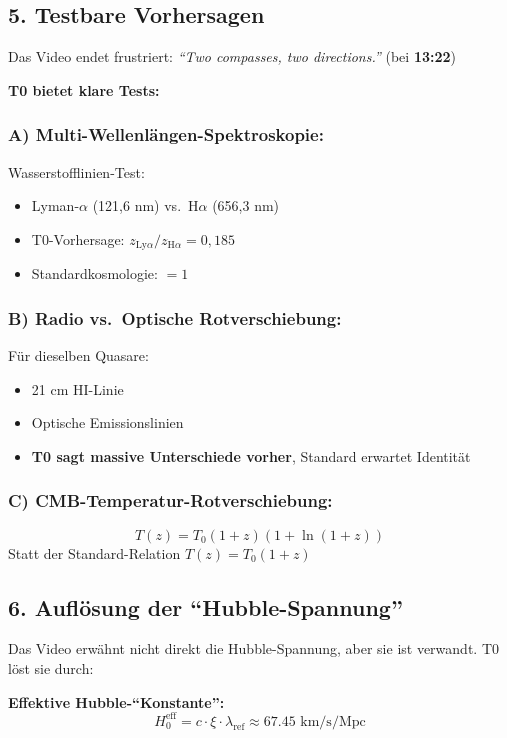 \documentclass{article}
\begin{document}
	\subsection{5. Testbare Vorhersagen}
	
	Das Video endet frustriert: \textit{``Two compasses, two directions.''} (bei \textbf{13:22})
	
	\textbf{T0 bietet klare Tests:}
	
	\subsubsection{A) Multi-Wellenlängen-Spektroskopie:}
	
	Wasserstofflinien-Test:
	\begin{itemize}
		\item Lyman-$\alpha$ (121,6 nm) vs.\ H$\alpha$ (656,3 nm)
		\item T0-Vorhersage: $z_{\mathrm{Ly}\alpha} / z_{\mathrm{H}\alpha} = 0{,}185$
		\item Standardkosmologie: $= 1$
	\end{itemize}
	
	\subsubsection{B) Radio vs.\ Optische Rotverschiebung:}
	Für dieselben Quasare:
	\begin{itemize}
		\item 21 cm HI-Linie
		\item Optische Emissionslinien
		\item \textbf{T0 sagt massive Unterschiede vorher}, Standard erwartet Identität
	\end{itemize}
	
	\subsubsection{C) CMB-Temperatur-Rotverschiebung:}
	$$T(z) = T_0(1+z)(1+\ln(1+z))$$
	Statt der Standard-Relation $T(z) = T_0(1+z)$
	
	\subsection{6. Auflösung der ``Hubble-Spannung''}
	
	Das Video erwähnt nicht direkt die Hubble-Spannung, aber sie ist verwandt. T0 löst sie durch:
	
	\textbf{Effektive Hubble-``Konstante'':}
	$$H_0^{\text{eff}} = c \cdot \xi \cdot \lambda_{\text{ref}} \approx 67.45 \text{ km/s/Mpc}$$
	
\end{document}
